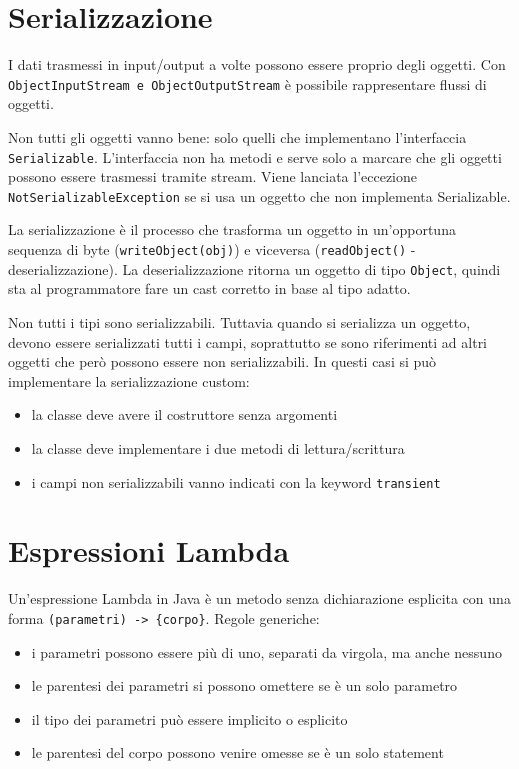 \section{Serializzazione}
I dati trasmessi in input/output a volte possono essere proprio degli oggetti. Con \texttt{ObjectInputStream e ObjectOutputStream} è possibile rappresentare flussi di oggetti. 

Non tutti gli oggetti vanno bene: solo quelli che implementano l'interfaccia \texttt{Serializable}. L'interfaccia non ha metodi e serve solo a marcare che gli oggetti possono essere trasmessi tramite stream. Viene lanciata l'eccezione \texttt{NotSerializableException} se si usa un oggetto che non implementa Serializable.

La serializzazione è il processo che trasforma un oggetto in un'opportuna sequenza di byte (\texttt{writeObject(obj)}) e viceversa (\texttt{readObject()} - deserializzazione). La deserializzazione ritorna un oggetto di tipo \texttt{Object}, quindi sta al programmatore fare un cast corretto in base al tipo adatto. 

Non tutti i tipi sono serializzabili. Tuttavia quando si serializza un oggetto, devono essere serializzati tutti i campi, soprattutto se sono riferimenti ad altri oggetti che però possono essere non serializzabili. In questi casi si può implementare la serializzazione custom:
\begin{itemize}
\item la classe deve avere il costruttore senza argomenti
\item la classe deve implementare i due metodi di lettura/scrittura
\item i campi non serializzabili vanno indicati con la keyword \texttt{transient}
\end{itemize}

\section{Espressioni Lambda}
Un'espressione Lambda in Java è un metodo senza dichiarazione esplicita con una forma \texttt{(parametri) -> \{corpo\}}.
Regole generiche:
\begin{itemize}
\item i parametri possono essere più di uno, separati da virgola, ma anche nessuno
\item le parentesi dei parametri si possono omettere se è un solo parametro
\item il tipo dei parametri può essere implicito o esplicito
\item le parentesi del corpo possono venire omesse se è un solo statement
\end{itemize}

